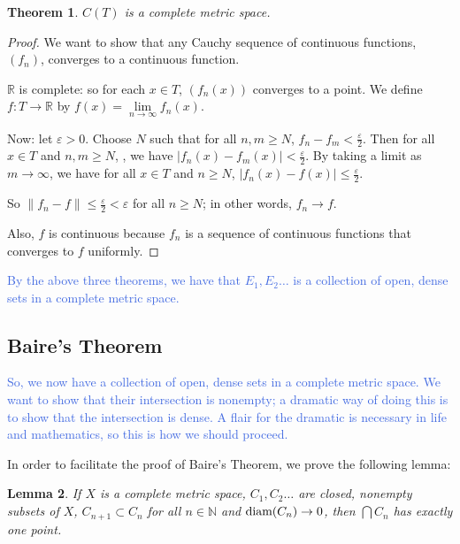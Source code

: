 \documentclass{amsart}
\newcommand{\vep}{\varepsilon}
\newcommand{\N}{\mathbb{N}}
\newcommand{\R}{\mathbb{R}}
\newcommand{\diam}{\text{\rm diam}}
\newcommand{\colorcomment}[2]{\textcolor{#1}{#2}} %
\newcommand{\absval}[1]{\lvert #1 \rvert}
\newcommand{\norm}[1]{\|#1\|}
\newtheorem{thm}{Theorem}[section]
\newtheorem{lem}[thm]{Lemma}
\theoremstyle{definition}
\begin{document}
\begin{thm}
$C(T)$ is a complete metric space.
\end{thm}

\begin{proof}
We want to show that any Cauchy sequence of continuous functions, $(f_n)$, converges to a continuous function.

$\R$ is complete: so for each $x \in T$, $(f_n(x))$ converges to a point. We define $f: T \to \R$ by $f(x) = \lim\limits_{n \to \infty} f_n(x)$.

Now: let $\vep >0$. Choose $N$ such that for all $n,m \geq N$, ${f_n-f_m} < \frac{\vep}{2}$. 
Then for all $x \in T$ and $n,m \geq N$, , we have $\absval{f_n(x) - f_m(x)} < \frac{\vep}{2}$.
By taking a limit as $m \to \infty$, we have for all $x \in T$ and $n \geq N$, $\absval{f_n(x) - f(x)} \leq \frac{\vep}{2}$.

So $\norm{f_n - f} \leq \frac{\vep}{2} < \vep$ for all $n \geq N$; in other words, $f_n \to f$.

Also, $f$ is continuous because $f_n$ is a sequence of continuous functions that converges to $f$ uniformly.

\end{proof}

\colorcomment{RoyalBlue}{By the above three theorems, we have that $E_1, E_2 \ldots$ is a collection of open, dense sets in a complete metric space.}

\subsection{Baire's Theorem}

\colorcomment{RoyalBlue}{So, we now have a collection of open, dense sets in a complete metric space. 
We want to show that their intersection is nonempty; a dramatic way of doing this is to show that the intersection is dense. 
A flair for the dramatic is necessary in life and mathematics, so this is how we should proceed.}

In order to facilitate the proof of Baire's Theorem, we prove the following lemma:

\begin{lem}
If $X$ is a complete metric space, $C_1, C_2 \ldots$ are closed, nonempty subsets of $X$, $C_{n+1} \subset C_n$ for all $n \in \N$ and $\diam(C_n) \to 0$, then $\bigcap C_n$ has exactly one point.
\end{lem}
\end{document}
